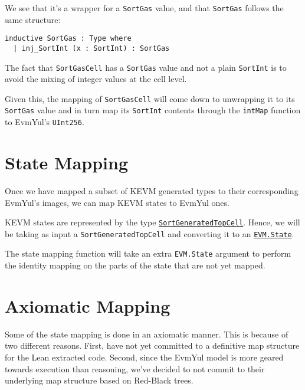 We see that it's a wrapper for a \texttt{SortGas} value, and that
\texttt{SortGas} follows the same structure:

\begin{verbatim}
inductive SortGas : Type where
  | inj_SortInt (x : SortInt) : SortGas
\end{verbatim}

The fact that \texttt{SortGasCell} has a \texttt{SortGas} value and not a plain
\texttt{SortInt} is to avoid the mixing of integer values at the cell level.

Given this, the mapping of \texttt{SortGasCell} will come down to unwrapping it
to its \texttt{SortGas} value and in turn map its \texttt{SortInt} contents
through the \texttt{intMap} function to EvmYul's \texttt{UInt256}.

\section{State Mapping}

Once we have mapped a subset of KEVM generated types to their corresponding
EvmYul's images, we can map KEVM states to EvmYul ones.

\begin{definition}[stateMap]
\leanok\label{def:stateMap}

KEVM states are represented by the type
\href{https://runtimeverification.github.io/evm-equivalence/docs/EvmEquivalence/KEVM2Lean/Sorts.html#SortGeneratedTopCell}{\texttt{SortGeneratedTopCell}}.
Hence, we will be taking as input a \texttt{SortGeneratedTopCell} and converting
it to an
\href{https://runtimeverification.github.io/evm-equivalence/docs/EvmYul/EVM/State.html#EvmYul.EVM.State}{\texttt{EVM.State}}.

The state mapping function will take an extra \texttt{EVM.State} argument to
perform the identity mapping on the parts of the state that are not yet mapped.
\end{definition}

\section{Axiomatic Mapping}

Some of the state mapping is done in an axiomatic manner. This is because of two
different reasons. First, have not yet committed to a definitive map structure
for the Lean extracted code. Second, since the EvmYul model is more geared
towards execution than reasoning, we've decided to not commit to their
underlying map structure based on Red-Black trees.

